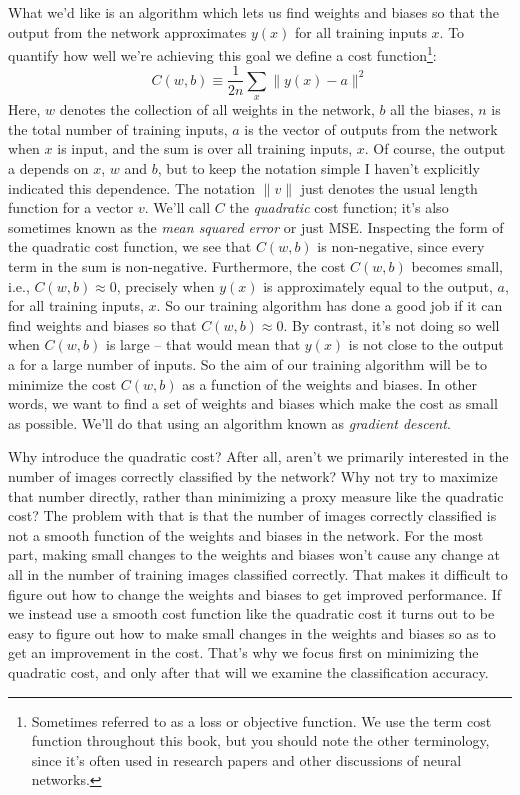 \documentclass[a4paper,twoside,10pt]{book}
\begin{document}
What we'd like is an algorithm which lets us find weights and biases so that the output from the network approximates $y(x)$ for all training inputs $x$. To quantify how well we're achieving this goal we define a cost function\footnote{Sometimes referred to as a loss or objective function. We use the term cost function throughout this book, but you should note the other terminology, since it's often used in research papers and other discussions of neural networks.}:
\begin{equation}
	C(w,b) \equiv\frac1{2n}\sum_x\|y(x)-a\|^2
	\label{eq:6}
\end{equation}
Here, $w$ denotes the collection of all weights in the network, $b$ all the biases, $n$ is the total number of training inputs, $a$ is the vector of outputs from the network when $x$ is input, and the sum is over all training inputs, $x$. Of course, the output a depends on $x$, $w$ and $b$, but to keep the notation simple I haven't explicitly indicated this dependence. The notation $\|v\|$ just denotes the usual length function for a vector $v$. We'll call $C$ the \textit{quadratic} cost function; it's also sometimes known as the \textit{mean squared error} or just MSE. Inspecting the form of the quadratic cost function, we see that $C(w,b)$ is non-negative, since every term in the sum is non-negative. Furthermore, the cost $C(w,b)$ becomes small, i.e., $C(w,b)\approx0$, precisely when $y(x)$ is approximately equal to the output, $a$, for all training inputs, $x$. So our training algorithm has done a good job if it can find weights and biases so that $C(w,b)\approx0$. By contrast, it's not doing so well when $C(w,b)$ is large -- that would mean that $y(x)$ is not close to the output a for a large number of inputs. So the aim of our training algorithm will be to minimize the cost $C(w,b)$ as a function of the weights and biases. In other words, we want to find a set of weights and biases which make the cost as small as possible. We'll do that using an algorithm known as \textit{gradient descent}.

Why introduce the quadratic cost? After all, aren't we primarily interested in the number of images correctly classified by the network? Why not try to maximize that number directly, rather than minimizing a proxy measure like the quadratic cost? The problem with that is that the number of images correctly classified is not a smooth function of the weights and biases in the network. For the most part, making small changes to the weights and biases won't cause any change at all in the number of training images classified correctly. That makes it difficult to figure out how to change the weights and biases to get improved performance. If we instead use a smooth cost function like the quadratic cost it turns out to be easy to figure out how to make small changes in the weights and biases so as to get an improvement in the cost. That's why we focus first on minimizing the quadratic cost, and only after that will we examine the classification accuracy.
\end{document}
